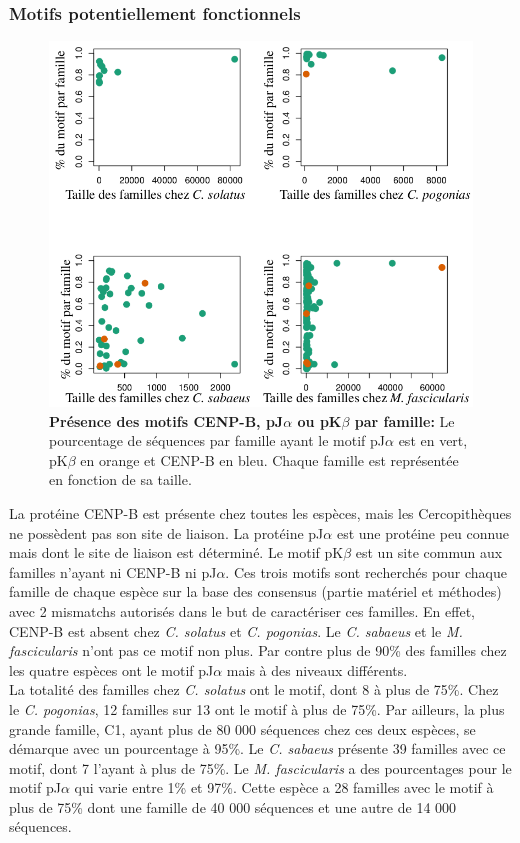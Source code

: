 \documentclass[12pt,a4paper]{article}
\begin{document}
			\subsubsection{Motifs potentiellement fonctionnels}
\begin{figure}
	\center	
	\includegraphics[scale=0.4]{img/graphique_motifs.png}
	\caption{\textbf{Présence des motifs CENP-B, pJ$\alpha$ ou pK$\beta$ par famille:}
	Le pourcentage de séquences par famille ayant le motif pJ$\alpha$ est en vert, pK$\beta$ en orange et CENP-B en bleu. Chaque famille est représentée en fonction de sa taille.
	\label{fig:motif}} 
\end{figure}
			La protéine CENP-B est présente chez toutes les espèces, mais les Cercopithèques ne possèdent pas son site de liaison. La protéine pJ$\alpha$ est une protéine peu connue mais dont le site de liaison est déterminé. Le motif pK$\beta$ est un site commun aux familles n'ayant ni CENP-B ni pJ$\alpha$. Ces trois motifs sont recherchés pour chaque famille de chaque espèce sur la base des consensus (partie matériel et méthodes) avec 2 mismatchs autorisés dans le but de caractériser ces familles. En effet, CENP-B est absent chez \textit{C. solatus} et \textit{C. pogonias}. Le \textit{C. sabaeus} et le \textit{M. fascicularis} n'ont pas ce motif non plus. Par contre plus de 90\% des familles chez les quatre espèces ont le motif pJ$\alpha$ mais à des niveaux différents.\\
		La totalité des familles chez \textit{C. solatus} ont le motif, dont 8 à plus de 75\%. Chez le \textit{C. pogonias}, 12 familles sur 13 ont le motif à plus de 75\%. Par ailleurs, la plus grande famille, C1, ayant plus de 80 000 séquences chez ces deux espèces, se démarque avec un pourcentage à 95\%. Le \textit{C. sabaeus} présente 39 familles avec ce motif, dont 7 l'ayant à plus de 75\%. Le \textit{M. fascicularis} a des pourcentages pour le motif pJ$\alpha$ qui varie entre 1\% et 97\%. Cette espèce a 28 familles avec le motif à plus de 75\% dont une famille de  40 000 séquences et une autre de 14 000 séquences.\\
\end{document}
